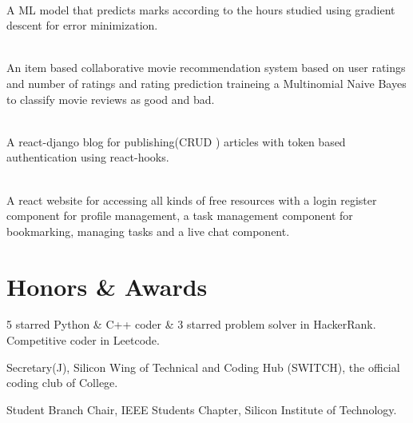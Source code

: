 \documentclass[]{deedy-resume-openfont}
\begin{document}
    \hfill {}\\
    A ML model that predicts marks according to the hours studied using gradient descent for error minimization.\\
    \sectionsep
  

    \hfill {}\\
    An item based collaborative movie recommendation system based on user ratings and number of ratings and rating prediction traineing a Multinomial Naive Bayes to classify movie reviews as good and bad.\\
    \sectionsep
  

    \hfill {}\\
    A react-django blog for publishing(CRUD ) articles with token based authentication using react-hooks. \\
    \sectionsep
  

    \hfill {}\\
    A react website for accessing all kinds of free resources with a login register component for profile management, a task management component for bookmarking, managing tasks and a live chat component.\\
    \sectionsep
%
%
\section{Honors \& Awards}
\begin{tightemize}
\item 5 starred Python \& C++ coder \& 3 starred problem solver in HackerRank. Competitive coder in Leetcode.\\
\item Secretary(J), Silicon Wing of Technical and Coding Hub (SWITCH), the official coding club of College.\\
\item Student Branch Chair, IEEE Students\textquotesingle{} Chapter, Silicon Institute of Technology.\\
\end{tightemize}
     \ 
     
\end{document}
